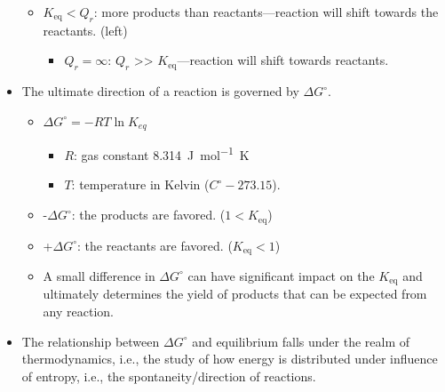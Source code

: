 \documentclass[12pt,a4paper]{article}
\begin{document}
\begin{itemize}
\begin{itemize}
            \item {\color{pos}\(K_{\text{eq}} < Q_r \)}: more products than reactants---reaction will shift towards the {\color{pos}reactants}. (left)
                \begin{itemize}
                    \item \(Q_r = \infty\): \(Q_r\) >> \(K_{\text{eq}}\)---reaction will shift towards reactants. 
                \end{itemize}
        \end{itemize}
    \item The ultimate direction of a reaction is governed by \(\Delta G^\circ\).
        \begin{itemize}
            \item \(\Delta G^\circ = -RT\ln{K_{eq}}\)
                \begin{itemize}
                    \item \(R\): gas constant \SI{8.314}{J\per\mol.K}
                    \item \(T\): temperature in Kelvin (\(C^\circ-273.15\)). 
                \end{itemize}
            \item {\color{neg}-\(\Delta G^\circ\)}: the {\color{neg}products} are favored. (\(1 < K_{\text{eq}}\)) 
            \item {\color{pos}+\(\Delta G^\circ\)}: the {\color{pos}reactants} are favored. (\(K_{\text{eq}} < 1\))
            \item A small difference in \(\Delta G^\circ\) can have significant impact on the \(K_{\text{eq}}\) and ultimately determines the yield of products that can be expected from any reaction.
        \end{itemize}
    \item The relationship between \(\Delta G^\circ\) and equilibrium falls under the realm of {\color{o-Sun}thermodynamics}, i.e., the study of how energy is distributed under influence of entropy, i.e., the spontaneity/direction of reactions.
\end{itemize}
\end{document}

